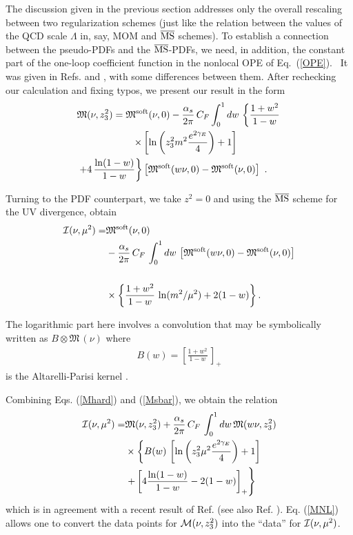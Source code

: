 \documentclass[aps,prd,twocolumn,showpacs,preprintnumbers,superscriptaddress]{revtex4-1}
\newcommand{\nn}{\nonumber \\ }
\begin{document}
The  discussion given in the  previous section   addresses  only the 
overall  rescaling between  two regularization schemes
(just like    the  relation between the values of the QCD scale $\Lambda$ in, say, MOM and
$\overline{\rm MS}$ schemes). 
To  establish a connection  between the pseudo-PDFs and  the 
$\overline{\rm MS}$-PDFs, we  need, in addition, the constant part of the one-loop 
coefficient function in the nonlocal OPE of  \mbox{Eq. (\ref{OPE}).  } 
It   was given  in Refs. \cite{Ji:2017rah} and \cite{Radyushkin:2017lvu},
with some differences between them. 
After rechecking our calculation and fixing  typos,
we present our result  in the form 
  \begin{align} 
  &
{\mathfrak M}  (\nu, z_3^2)    = {\mathfrak  M}^{\rm soft}  ( \nu, 0)  -  \frac{\alpha_s}{2\pi} \, C_F
\int_0^1  dw \,  \left \{   \frac{1+w^2} {1-w}    \right.  \nn & \left.  \hspace{2cm} \times
  \left [  \ln \left (z_3^2m^2\frac{  e^{2\gamma_E}}{4} \right )   +1 \right ]  
\right. \nn    & \left. 
+ 4  \,  \frac{\ln (1-w)}{1-w} 
\right \}  \left [
{\mathfrak  M}^{\rm soft}  (w \nu,0) -  {\mathfrak  M}^{\rm soft}  ( \nu,0) \right ]\  .
 \label{Mhard} 
 \end{align}
 

 
Turning to the PDF counterpart, we take $z^2=0$ and using the  $\overline{\rm MS}$ scheme for the UV divergence, obtain 
   \begin{align}
{\cal I}  (\nu, \mu^2)
  =&  {\mathfrak  M}^{\rm soft}  ( \nu, 0) \nn & -  \frac{\alpha_s}{2\pi} \, C_F\, 
    \int_0^1  dw \,   
  \left [
{\mathfrak  M}^{\rm soft}  (w \nu, 0) -  {\mathfrak  M}^{\rm soft}  ( \nu, 0) \right ]\nn & 
  \nn & \times \left \{    \frac{1+w^2} {1-w} \,  \ln (m^2/ \mu^2)   + 2 (1-w) \right \}
 .
\label{Msbar}
 \end{align}
 
The logarithmic part here involves a convolution that  may be symbolically written as  
   $
B \otimes {\mathfrak M}\,  (\nu) $ where 
     \begin{align}
B(w) = 
\left [ \frac{1+w^2}{1- w} \, \right ]_+  
\label{AP}
 \end{align}
 is  the Altarelli-Parisi kernel  \cite{Altarelli:1977zs}. 
 
Combining Eqs. (\ref {Mhard}) and (\ref{Msbar}), we obtain 
 the relation
  \begin{align} 
{\cal I}  (\nu, \mu^2)    = & {\mathfrak  M} ( \nu, z_3^2) +  \frac{\alpha_s}{2\pi} \, C_F\,  
\int_0^1  dw \,   {\mathfrak  M}  (w \nu,z_3^2)   \nn &
 \times  \left  \{   B(w) \, \left [ \ln \left (z_3^2\mu^2 \frac{  e^{2\gamma_E}}{4} \right )  +1 
 \right ]   \right. \nn & \left. 
+   \left [ 4  \frac{\ln (1-w)}{1-w} - 2 (1-w)  \right ]_+ \right  \} 
\  
\label{MNL}
 \end{align}
 which is in agreement with a recent result of Ref. \cite{Izubuchi:2018srq}
 (see  also  Ref. \cite{Zhang:2018ggy}).
Eq. (\ref{MNL})   allows  one to convert the  data points 
 for ${\cal  M} ( \nu, z_3^2) $  into the ``data'' for ${\cal  I} (\nu, \mu^2)$.   
 
\end{document}
